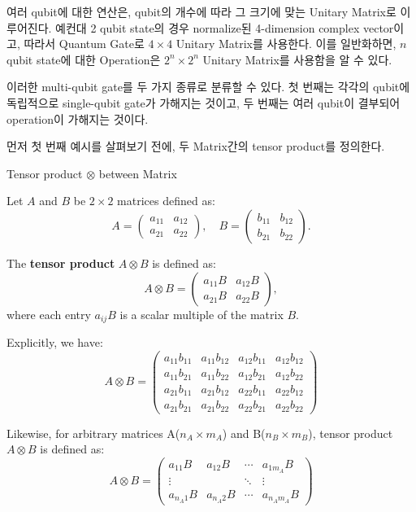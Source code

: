 여러 qubit에 대한 연산은, qubit의 개수에 따라 그 크기에 맞는 Unitary Matrix로 이루어진다. 예컨대 2 qubit state의 경우 normalize된 4-dimension complex vector이고, 따라서 Quantum Gate로 \(4 \times 4\) Unitary Matrix를 사용한다. 이를 일반화하면, $n$ qubit state에 대한 Operation은 \(2^n \times 2^n\) Unitary Matrix를 사용함을 알 수 있다.

이러한 multi-qubit gate를 두 가지 종류로 분류할 수 있다. 첫 번째는 각각의 qubit에 독립적으로 single-qubit gate가 가해지는 것이고, 두 번째는 여러 qubit이 결부되어 operation이 가해지는 것이다.

\noindent 먼저 첫 번째 예시를 살펴보기 전에, 두 Matrix간의 tensor product를 정의한다.
\begin{definition}
Tensor product \(\otimes\) between Matrix

Let \( A \) and \( B \) be \(2 \times 2\) matrices defined as:
\[
A = \begin{pmatrix}
a_{11} & a_{12} \\
a_{21} & a_{22}
\end{pmatrix}, \quad
B = \begin{pmatrix}
b_{11} & b_{12} \\
b_{21} & b_{22}
\end{pmatrix}.
\]

The \textbf{tensor product} \( A \otimes B \) is defined as:
\[
A \otimes B =
\begin{pmatrix}
a_{11}B & a_{12}B \\
a_{21}B & a_{22}B
\end{pmatrix},
\]
where each entry \( a_{ij}B \) is a scalar multiple of the matrix \( B \).

Explicitly, we have:
\[
A \otimes B =
\begin{pmatrix}
a_{11}b_{11} & a_{11}b_{12} & a_{12}b_{11} & a_{12}b_{12} \\
a_{11}b_{21} & a_{11}b_{22} & a_{12}b_{21} & a_{12}b_{22} \\
a_{21}b_{11} & a_{21}b_{12} & a_{22}b_{11} & a_{22}b_{12} \\
a_{21}b_{21} & a_{21}b_{22} & a_{22}b_{21} & a_{22}b_{22}
\end{pmatrix}
\]

Likewise, for arbitrary matrices A(\(n_A \times m_A\)) and B(\(n_B \times m_B\)), tensor product \( A \otimes B \) is defined as:
\[
A \otimes B =
\begin{pmatrix}
a_{11}B & a_{12}B & \cdots & a_{1m_A}B \\
\vdots &          & \ddots & \vdots  \\
a_{n_A 1}B & a_{n_A 2}B & \cdots & a_{n_A m_A}B
\end{pmatrix}
\]
\end{definition}

